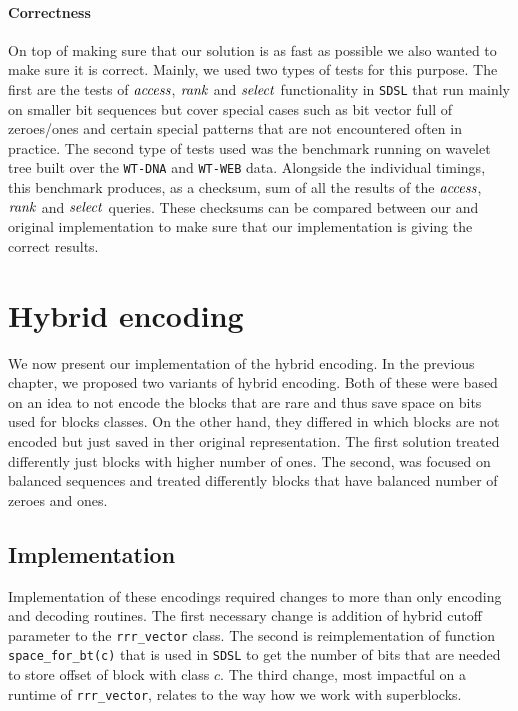 \paragraph{Correctness}

On top of making sure that our solution is as fast as possible we also wanted to make sure it is
correct. Mainly, we used two types of tests for this purpose. The first are the tests of $\mathit{access}$,
$\mathit{rank}$ and $\mathit{select}$ functionality in \texttt{SDSL} that run mainly on smaller bit sequences
but cover special cases such as bit vector full of zeroes/ones and certain special patterns
that are not encountered often in practice. The second type of tests used was the benchmark
running on wavelet tree built over the \texttt{WT-DNA} and \texttt{WT-WEB} data. Alongside
the individual timings, this benchmark produces, as a checksum, sum of all the results of the
$\mathit{access}$, $\mathit{rank}$ and $\mathit{select}$ queries. These checksums can be compared between our and original
implementation to make sure that our implementation is giving the correct results.

\section{Hybrid encoding}

We now present our implementation of the hybrid encoding. In the previous chapter, we
proposed two variants of hybrid encoding. Both of these were based on an idea to not
encode the blocks that are rare and thus save space on bits used for blocks classes. On
the other hand, they differed in which blocks are not encoded but just saved in ther original
representation. The first solution treated differently just blocks with higher number of ones.
The second, was focused on balanced sequences and treated differently blocks that have balanced
number of zeroes and ones.

\subsection{Implementation}

Implementation of these encodings required changes to more than only encoding and decoding
routines. The first necessary change is addition of hybrid cutoff parameter
to the \texttt{rrr\_vector} class. The second is reimplementation of function
\texttt{space\_for\_bt(c)} that is used in \texttt{SDSL} to get the number of bits that are
needed to store offset of block with class $c$. The third change, most impactful on a runtime
of \texttt{rrr\_vector}, relates to the way how we work with superblocks.

